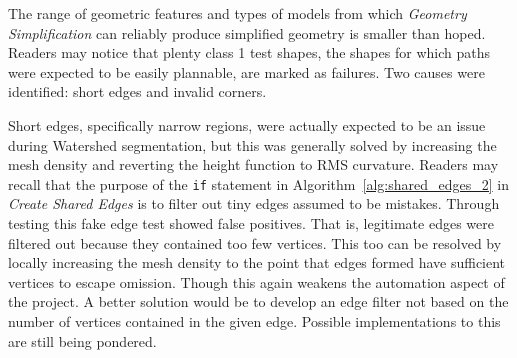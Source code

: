 The range of geometric features and types of models from which \textit{Geometry Simplification} can reliably produce simplified geometry is smaller than hoped.
Readers may notice that plenty class 1 test shapes, the shapes for which paths were expected to be easily plannable, are marked as failures.
Two causes were identified: short edges and invalid corners.

Short edges, specifically narrow regions, were actually expected to be an issue during Watershed segmentation, but this was generally solved by increasing the mesh density and reverting the height function to RMS curvature.
Readers may recall that the purpose of the \verb|if| statement in Algorithm~\ref{alg:shared_edges_2} in \textit{Create Shared Edges} is to filter out tiny edges assumed to be mistakes.
Through testing this fake edge test showed false positives.
That is, legitimate edges were filtered out because they contained too few vertices.
This too can be resolved by locally increasing the mesh density to the point that edges formed have sufficient vertices to escape omission.
Though this again weakens the automation aspect of the project.
A better solution would be to develop an edge filter not based on the number of vertices contained in the given edge.
Possible implementations to this are still being pondered.

